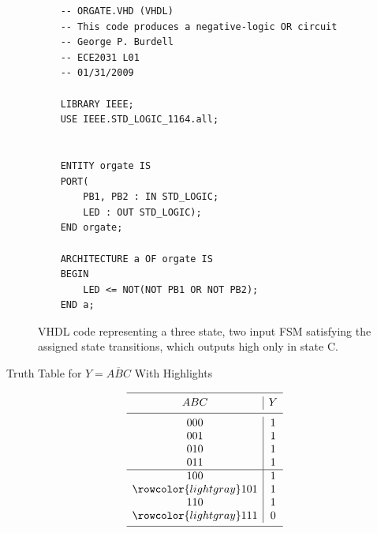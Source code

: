 \documentclass[letterpaper,11pt]{article}
\begin{document}
\begin{figure}[H] %
	\centering %
	\begin{lstlisting} 
	-- ORGATE.VHD (VHDL)
	-- This code produces a negative-logic OR circuit
	-- George P. Burdell
	-- ECE2031 L01
	-- 01/31/2009
	
	LIBRARY IEEE;
	USE IEEE.STD_LOGIC_1164.all;


	ENTITY orgate IS
	PORT(
		PB1, PB2 : IN STD_LOGIC;
		LED : OUT STD_LOGIC);
	END orgate;

	ARCHITECTURE a OF orgate IS
	BEGIN
		LED <= NOT(NOT PB1 OR NOT PB2);
	END a;
	\end{lstlisting}
	\caption{VHDL code representing a three state, two input FSM satisfying the assigned state transitions, which outputs high only in state C.} %
\end{figure}

\begin{table}[H] %
      \caption{Truth Table for $Y = \overline{ABC}$ With Highlights} %
     $$ 
         \begin{array}{c|c}
            \hline
            \noalign{\smallskip}
                                ABC & Y \\
            \noalign{\smallskip}
            \hline
            \noalign{\smallskip}
								000 & 1 \\
								001 & 1 \\
								010 & 1 \\
								011 & 1 \\
			\hline
								100 & 1 \\
			\rowcolor{lightgray}101 & 1\\
								110 & 1 \\
			\rowcolor{lightgray}111 & 0 \\
            \noalign{\smallskip}
            \hline
         \end{array}
     $$ 
\end{table}
\end{document}
